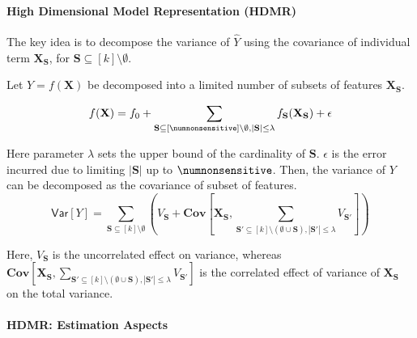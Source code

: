 \paragraph{High Dimensional Model Representation (HDMR)~\cite{li2010global}} The key idea is to decompose the variance of $ \hat{Y} $ using the covariance of individual term $ \mathbf{X}_{\mathbf{S}} $, for $ \mathbf{S} \subseteq [k] \setminus \emptyset $. 

Let $ Y =  f(\mathbf{X}) $ be decomposed into a limited number of subsets of features $ \mathbf{X}_{\mathbf{S}} $. 

\[
f(\mathbf{X})  =  f_0 +  \sum_{\mathbf{S} \subseteq [\numnonsensitive] \setminus \emptyset, |\mathbf{S}| \le \lambda} f_{\mathbf{S}}(\mathbf{X}_{\mathbf{S}}) + \epsilon
\]


Here parameter $ \lambda $ sets the upper bound of the cardinality of $ \mathbf{S} $. $ \epsilon $ is the error incurred due to limiting $ |\mathbf{S}| $ up to $ \numnonsensitive $.  Then, the variance of $ Y $ can be decomposed as the covariance of subset of features.
\[
\mathsf{Var}[Y] = \sum_{\mathbf{S} \subseteq [k] \setminus \emptyset} (V_{\mathbf{S}}  + \mathbf{Cov}[\mathbf{X}_{\mathbf{S}}, \sum_{\mathbf{S}' \subseteq [k] \setminus (\emptyset \cup \mathbf{S}), |\mathbf{S}'| \le \lambda} V_{\mathbf{S}'}])
\]

Here, $ V_{\mathbf{S}} $ is the uncorrelated effect on variance, whereas $ \mathbf{Cov}[\mathbf{X}_{\mathbf{S}}, \sum_{\mathbf{S}' \subseteq [k] \setminus (\emptyset \cup \mathbf{S}), |\mathbf{S}'| \le \lambda} V_{\mathbf{S}'}] $ is the correlated effect of variance of $ \mathbf{X}_{\mathbf{S}} $ on the total variance.



\paragraph{HDMR: Estimation Aspects~\cite{li2010global}}

